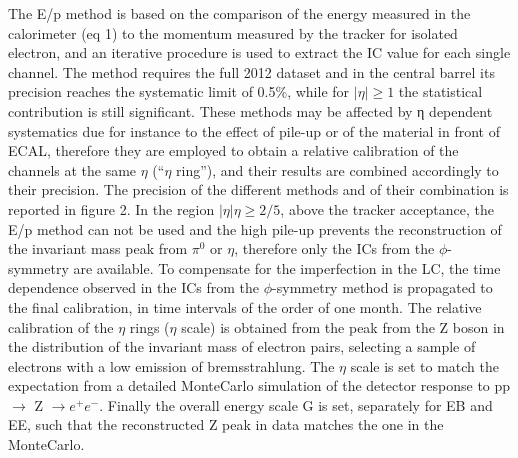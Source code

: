 \documentclass[journal]{IEEEtran}
\begin{document}
The E/p method is based on the comparison of the energy measured in the calorimeter (eq 1) to the momentum measured by the tracker for isolated electron, and an iterative procedure is used to extract the IC value for each single channel. The method requires the full 2012 dataset and in the central barrel its precision reaches the systematic limit of 0.5\%, while for $\vert\eta\vert\ge1$ the statistical contribution is still significant.
These methods may be affected by η dependent systematics due for instance to the effect of pile-up or of the material in front of ECAL, therefore they are employed to obtain a relative calibration of the channels at the same $\eta$ (``$\eta$ ring''), and their results are combined accordingly to their precision. The precision of the different methods and of their combination is reported in figure 2. In the region $\vert\eta\vert\eta\ge2/5$, above the tracker acceptance, the E/p method can not be used and the high pile-up prevents the reconstruction of the invariant mass peak from $\pi^0$ or $\eta$, therefore only the ICs from the $\phi$-symmetry are available.
To compensate for the imperfection in the LC, the time dependence observed in the ICs from the $\phi$-symmetry method is propagated to the final calibration, in time intervals of the order of one month.
The relative calibration of the $\eta$ rings ($\eta$ scale) is obtained from the peak from the Z boson in the distribution of the invariant mass of electron pairs, selecting a sample of electrons with a low emission of bremsstrahlung. The $\eta$ scale is set to match the expectation from a detailed MonteCarlo simulation of the detector response to pp $\to$ Z $\to e^+e^-$.
Finally the overall energy scale G is set, separately for EB and EE, such that the reconstructed Z peak in data matches the one in the MonteCarlo.
\end{document}
